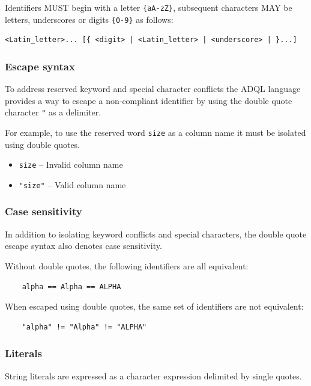 \documentclass[11pt,a4paper]{ivoa}
\begin{document}
Identifiers MUST begin with a letter
\verb:{aA-zZ}:, subsequent characters MAY be letters, underscores or
digits \verb:{0-9}: as follows:

\begin{verbatim}
<Latin_letter>... [{ <digit> | <Latin_letter> | <underscore> | }...]
\end{verbatim}

\subsubsection{Escape syntax}
\label{sec:adql.escape}

To address reserved keyword and special character conflicts the ADQL language
provides a way to escape a non-compliant identifier by using the double
quote character \verb:": as a delimiter.

For example, to use the reserved word \verb:size: as a column name
it must be isolated using double quotes.

\begin{itemize}
    \item \verb:size: -- Invalid column name
    \item \verb:"size": -- Valid column name
\end{itemize}

\subsubsection{Case sensitivity}
\label{sec:adql.case}

In addition to isolating keyword conflicts and special characters,
the double quote escape syntax also denotes case sensitivity.

Without double quotes, the following identifiers are all equivalent:
\begin{verbatim}
    alpha == Alpha == ALPHA
\end{verbatim}

When escaped using double quotes, the same set of identifiers are not equivalent:
\begin{verbatim}
    "alpha" != "Alpha" != "ALPHA"
\end{verbatim}

\subsubsection{Literals}
\label{sec:literals}

String literals are expressed as a character expression delimited by single quotes.
\end{document}
